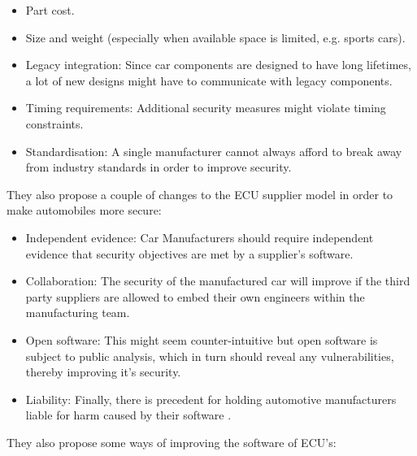 \documentclass[11pt]{article}
\begin{document}
\begin{itemize}
	\item Part cost.
	\item Size and weight (especially when available space is limited, e.g. sports cars).
	\item Legacy integration: Since car components are designed to have long lifetimes, a lot of new designs might have to communicate with legacy components.
	\item Timing requirements: Additional security measures might violate timing constraints.
	\item Standardisation: A single manufacturer cannot always afford to break away from industry standards in order to improve security.
\end{itemize}

They also propose a couple of changes to the ECU supplier model in order to make automobiles more secure:

\begin{itemize}
	\item Independent evidence: Car Manufacturers should require independent evidence that security objectives are met by a supplier’s software. 
	\item Collaboration: The security of the manufactured car will improve if the third party suppliers are allowed to embed their own engineers within the manufacturing team.
	\item Open software: This might seem counter-intuitive but open software is subject to public analysis, which in turn should reveal any vulnerabilities, thereby improving it's security.
	\item Liability: Finally, there is precedent for holding automotive manufacturers liable for harm caused by their software \cite{Precedent}.
\end{itemize}

They also propose some ways of improving the software of ECU's:
\end{document}
